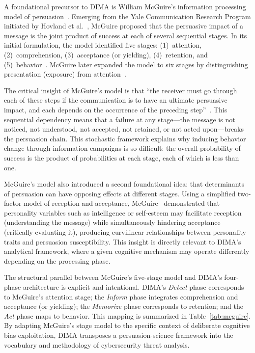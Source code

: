 \documentclass[11pt,a4paper]{article}
\begin{document}
A foundational precursor to DIMA is William McGuire's information processing model of persuasion~\cite{mcguire1968, mcguire1969, mcguire1985}. Emerging from the Yale Communication Research Program initiated by Hovland et al.~\cite{hovland1953}, McGuire proposed that the persuasive impact of a message is the joint product of success at each of several sequential stages. In its initial formulation, the model identified five stages: (1)~attention, (2)~comprehension, (3)~acceptance (or yielding), (4)~retention, and (5)~behavior~\cite{mcguire1969}. McGuire later expanded the model to six stages by distinguishing presentation (exposure) from attention~\cite{mcguire1985}.

The critical insight of McGuire's model is that ``the receiver must go through each of these steps if the communication is to have an ultimate persuasive impact, and each depends on the occurrence of the preceding step''~\cite[p.~173]{mcguire1969}. This sequential dependency means that a failure at any stage---the message is not noticed, not understood, not accepted, not retained, or not acted upon---breaks the persuasion chain. This stochastic framework explains why inducing behavior change through information campaigns is so difficult: the overall probability of success is the product of probabilities at each stage, each of which is less than one.

McGuire's model also introduced a second foundational idea: that determinants of persuasion can have opposing effects at different stages. Using a simplified two-factor model of reception and acceptance, McGuire~\cite{mcguire1968} demonstrated that personality variables such as intelligence or self-esteem may facilitate reception (understanding the message) while simultaneously hindering acceptance (critically evaluating it), producing curvilinear relationships between personality traits and persuasion susceptibility. This insight is directly relevant to DIMA's analytical framework, where a given cognitive mechanism may operate differently depending on the processing phase.

The structural parallel between McGuire's five-stage model and DIMA's four-phase architecture is explicit and intentional. DIMA's \textit{Detect} phase corresponds to McGuire's attention stage; the \textit{Inform} phase integrates comprehension and acceptance (or yielding); the \textit{Memorize} phase corresponds to retention; and the \textit{Act} phase maps to behavior. This mapping is summarized in Table~\ref{tab:mcguire}. By adapting McGuire's stage model to the specific context of deliberate cognitive bias exploitation, DIMA transposes a persuasion-science framework into the vocabulary and methodology of cybersecurity threat analysis.
\end{document}
